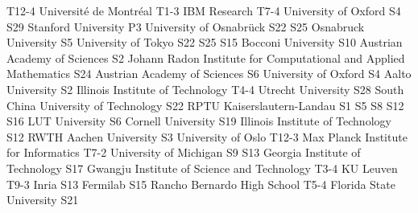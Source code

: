 \begin{multicols}{2}
{T12-4}
{}
{}
{}
{}
{}
{}
{Universit\'e de Montr\'eal}
{T1-3}
{}
{}
{}
{}
{}
{}
{IBM Research}
{T7-4}
{}
{}
{}
{}
{}
{}
{University of Oxford}
{S4}
{S29}
{}
{}
{}
{}
{}
{Stanford University}
{P3}
{}
{}
{}
{}
{}
{}
{University of Osnabr\"uck}
{S22}
{S25}
{}
{}
{}
{}
{}
{Osnabruck University}
{S5}
{}
{}
{}
{}
{}
{}
{University of Tokyo}
{S22}
{S25}
{S15}
{}
{}
{}
{}
{Bocconi University}
{S10}
{}
{}
{}
{}
{}
{}
{Austrian Academy of Sciences}
{S2}
{}
{}
{}
{}
{}
{}
{Johann Radon Institute for Computational and Applied Mathematics}
{S24}
{}
{}
{}
{}
{}
{}
{Austrian Academy of Sciences}
{S6}
{}
{}
{}
{}
{}
{}
{University of Oxford}
{S4}
{}
{}
{}
{}
{}
{}
{Aalto University}
{S2}
{}
{}
{}
{}
{}
{}
{Illinois Institute of Technology}
{T4-4}
{}
{}
{}
{}
{}
{}
{Utrecht University}
{S28}
{}
{}
{}
{}
{}
{}
{South China University of Technology}
{S22}
{}
{}
{}
{}
{}
{}
{RPTU Kaiserslautern-Landau}
{S1}
{S5}
{S8}
{S12}
{S16}
{}
{}
{LUT University}
{S6}
{}
{}
{}
{}
{}
{}
{Cornell University}
{S19}
{}
{}
{}
{}
{}
{}
{Illinois Institute of Technology}
{S12}
{}
{}
{}
{}
{}
{}
{RWTH Aachen University}
{S3}
{}
{}
{}
{}
{}
{}
{University of Oslo}
{T12-3}
{}
{}
{}
{}
{}
{}
{Max Planck Institute for Informatics}
{T7-2}
{}
{}
{}
{}
{}
{}
{University of Michigan}
{S9}
{S13}
{}
{}
{}
{}
{}
{Georgia Institute of Technology}
{S17}
{}
{}
{}
{}
{}
{}
{Gwangju Institute of Science and Technology}
{T3-4}
{}
{}
{}
{}
{}
{}
{KU Leuven}
{T9-3}
{}
{}
{}
{}
{}
{}
{Inria}
{S13}
{}
{}
{}
{}
{}
{}
{Fermilab}
{S15}
{}
{}
{}
{}
{}
{}
{Rancho Bernardo High School}
{T5-4}
{}
{}
{}
{}
{}
{}
{Florida State University}
{S21}
{}
{}
{}
{}
{}
{}

\end{multicols}
